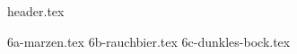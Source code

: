 \clearpage
{}
\divisorLine
{header.tex}
\begin{multicols}{2}
{6a-marzen.tex}
{6b-rauchbier.tex}
{6c-dunkles-bock.tex}
\end{multicols}